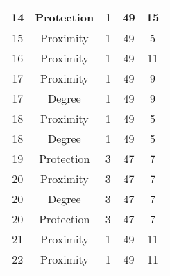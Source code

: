 \documentclass[results.tex]{subfiles}
\begin{document}
\begin{center}
\begin{tabular}{| c || c | c | c | c |}
            \hline
            14                      & Protection                   & 1                      & 49                      & 15                   \\
            \hline
            15                      & Proximity                    & 1                      & 49                      & 5                    \\
            \hline
            16                      & Proximity                    & 1                      & 49                      & 11                   \\
            \hline
            17                      & Proximity                    & 1                      & 49                      & 9                    \\
            \hline
            17                      & Degree                       & 1                      & 49                      & 9                    \\
            \hline
            18                      & Proximity                    & 1                      & 49                      & 5                    \\
            \hline
            18                      & Degree                       & 1                      & 49                      & 5                    \\
            \hline
            19                      & Protection                   & 3                      & 47                      & 7                    \\
            \hline
            20                      & Proximity                    & 3                      & 47                      & 7                    \\
            \hline
            20                      & Degree                       & 3                      & 47                      & 7                    \\
            \hline
            20                      & Protection                   & 3                      & 47                      & 7                    \\
            \hline
            21                      & Proximity                    & 1                      & 49                      & 11                   \\
            \hline
            22                      & Proximity                    & 1                      & 49                      & 11                   \\

\end{tabular}
\end{center}
\end{document}
